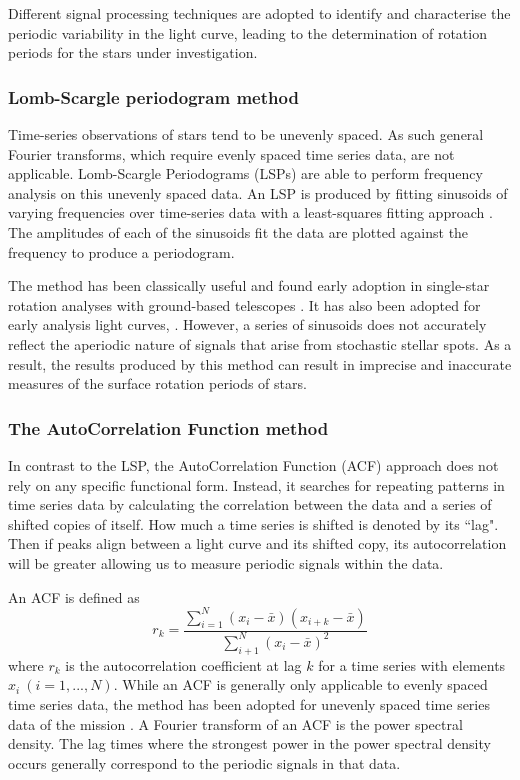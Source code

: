 Different signal processing techniques are adopted to identify and characterise the periodic variability in the light curve, leading to the determination of rotation periods for the stars under investigation.

\subsubsection*{Lomb-Scargle periodogram method}

Time-series observations of stars tend to be unevenly spaced.
As such general Fourier transforms, which require evenly spaced time series data, are not applicable.
Lomb-Scargle Periodograms (LSPs) are able to perform frequency analysis on this unevenly spaced data.
An LSP is produced by fitting sinusoids of varying frequencies over time-series data with a least-squares fitting approach \citep{lomb_least_1976, scargle_studies_1982}.
The amplitudes of each of the sinusoids fit the data are plotted against the frequency to produce a periodogram.

The method has been classically useful and found early adoption in single-star rotation analyses with ground-based telescopes \citep{mottola_slow_1995,scott_photometric_1992}.
It has also been adopted for early analysis \kepler{} light curves, \citep[see, e.g.,]{reinhold_fast_2013,reinhold_rotation_2013}. 
However, a series of sinusoids does not accurately reflect the aperiodic nature of signals that arise from stochastic stellar spots.
As a result, the results produced by this method can result in imprecise and inaccurate measures of the surface rotation periods of stars.

\subsubsection*{The AutoCorrelation Function method}

In contrast to the LSP, the AutoCorrelation Function (ACF) approach does not rely on any specific functional form. 
Instead, it searches for repeating patterns in time series data by calculating the correlation between the data and a series of shifted copies of itself.
How much a time series is shifted is denoted by its ``lag".
Then if peaks align between a light curve and its shifted copy, its autocorrelation will be greater allowing us to measure periodic signals within the data.

An ACF is defined as
\begin{equation}
r_k = \frac{\sum^N_{i=1} \left(x_i - \bar{x}\right)\left(x_{i+k}-\bar{x}\right)}{\sum^N_{i+1}\left(x_i - \bar{x}\right)^2}
\end{equation}
where $r_k$ is the autocorrelation coefficient at lag $k$ for a time series with elements $x_i \  (i = 1, ..., N)$.
While an ACF is generally only applicable to evenly spaced time series data, the method has been adopted for unevenly spaced time series data of the \kepler{} mission \citep[see, e.g.,][]{aigrain_transiting_2008,garcia_rotation_2014,mcquillan_rotation_2014}.
A Fourier transform of an ACF is the power spectral density.
The lag times where the strongest power in the power spectral density occurs generally correspond to the periodic signals in that data.

